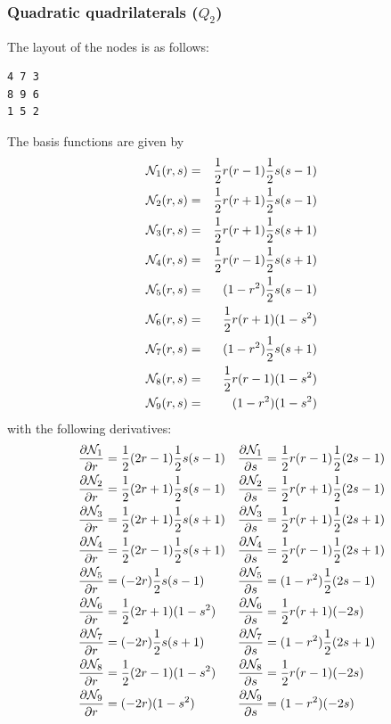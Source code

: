 \subsubsection{Quadratic quadrilaterals ($Q_2$)}
The layout of the nodes is as follows:
\begin{verbatim}
4 7 3
8 9 6
1 5 2
\end{verbatim}
The basis functions are given by 
\begin{eqnarray}
{\mathcal{N}}_1(r,s)&=& \frac{1}{2}r(r-1)  \frac{1}{2}s(s-1)\nonumber\\
{\mathcal{N}}_2(r,s)&=& \frac{1}{2}r(r+1)  \frac{1}{2}s(s-1)\nonumber\\
{\mathcal{N}}_3(r,s)&=& \frac{1}{2}r(r+1)  \frac{1}{2}s(s+1)\nonumber\\
{\mathcal{N}}_4(r,s)&=& \frac{1}{2}r(r-1)  \frac{1}{2}s(s+1)\nonumber\\
{\mathcal{N}}_5(r,s)&=&     (1-r^2)  \frac{1}{2}s(s-1)\nonumber\\
{\mathcal{N}}_6(r,s)&=& \frac{1}{2}r(r+1)      (1-s^2)\nonumber\\
{\mathcal{N}}_7(r,s)&=&     (1-r^2)  \frac{1}{2}s(s+1)\nonumber\\
{\mathcal{N}}_8(r,s)&=& \frac{1}{2}r(r-1)      (1-s^2)\nonumber\\
{\mathcal{N}}_9(r,s)&=&     (1-r^2)      (1-s^2)\nonumber
\end{eqnarray}
with the following derivatives:
\begin{align}
\frac{\partial {\mathcal{N}}_1}{\partial r}&= \frac{1}{2}(2r-1)  \frac{1}{2}s(s-1) &
\frac{\partial {\mathcal{N}}_1}{\partial s}&= \frac{1}{2}r(r-1)  \frac{1}{2}(2s-1)\nonumber\\
\frac{\partial {\mathcal{N}}_2}{\partial r}&= \frac{1}{2}(2r+1)  \frac{1}{2}s(s-1) &
\frac{\partial {\mathcal{N}}_2}{\partial s}&= \frac{1}{2}r(r+1)  \frac{1}{2}(2s-1)\nonumber\\
\frac{\partial {\mathcal{N}}_3}{\partial r}&= \frac{1}{2}(2r+1)  \frac{1}{2}s(s+1) &
\frac{\partial {\mathcal{N}}_3}{\partial s}&= \frac{1}{2}r(r+1)  \frac{1}{2}(2s+1)\nonumber\\
\frac{\partial {\mathcal{N}}_4}{\partial r}&= \frac{1}{2}(2r-1)  \frac{1}{2}s(s+1) &
\frac{\partial {\mathcal{N}}_4}{\partial s}&= \frac{1}{2}r(r-1)  \frac{1}{2}(2s+1)\nonumber\\
\frac{\partial {\mathcal{N}}_5}{\partial r}&=       (-2r)  \frac{1}{2}s(s-1) &
\frac{\partial {\mathcal{N}}_5}{\partial s}&=     (1-r^2)  \frac{1}{2}(2s-1)\nonumber\\
\frac{\partial {\mathcal{N}}_6}{\partial r}&= \frac{1}{2}(2r+1)     (1-s^2)&
\frac{\partial {\mathcal{N}}_6}{\partial s}&= \frac{1}{2}r(r+1)        (-2s)\nonumber\\
\frac{\partial {\mathcal{N}}_7}{\partial r}&=       (-2r)  \frac{1}{2}s(s+1)&
\frac{\partial {\mathcal{N}}_7}{\partial s}&=     (1-r^2)  \frac{1}{2}(2s+1)\nonumber\\
\frac{\partial {\mathcal{N}}_8}{\partial r}&= \frac{1}{2}(2r-1)     (1-s^2)&
\frac{\partial {\mathcal{N}}_8}{\partial s}&= \frac{1}{2}r(r-1)        (-2s)\nonumber\\
\frac{\partial {\mathcal{N}}_9}{\partial r}&=       (-2r)     (1-s^2)&
\frac{\partial {\mathcal{N}}_9}{\partial s}&=     (1-r^2)        (-2s)\nonumber
\end{align}

